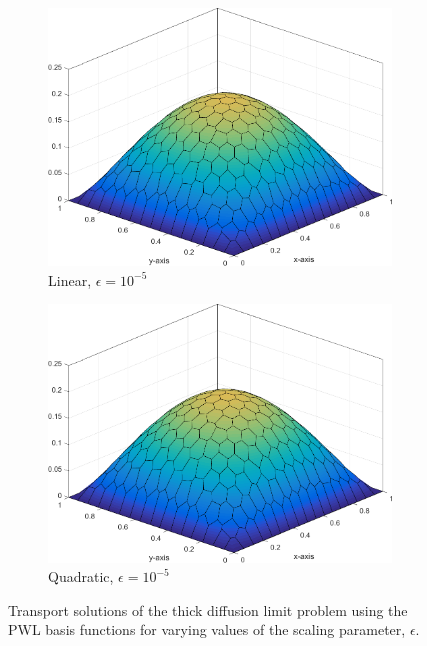 \begin{figure}
{\begin{subfigure}[b]{0.465\textwidth}
		\centering
		\label{subfig::DL_trans_pwl1_e5}
		\includegraphics[width=\textwidth]{figures/sec_BF/Sq_poly_PWLD_k=1_ep=1e-5.png}
		\caption{Linear, $\epsilon = 10^{-5}$}
	\end{subfigure}
	\hfill
	\begin{subfigure}[b]{0.465\textwidth}
		\centering
		\label{subfig::DL_trans_pwl2_e5}
		\includegraphics[width=\textwidth]{figures/sec_BF/Sq_poly_PWLD_k=2_ep=1e-5.png}
		\caption{Quadratic, $\epsilon = 10^{-5}$}
	\end{subfigure}
}
\caption{Transport solutions of the thick diffusion limit problem using the PWL basis functions for varying values of the scaling parameter, $\epsilon$.}
\label{fig::BF_Results_DL_PWLD}
\end{figure}

